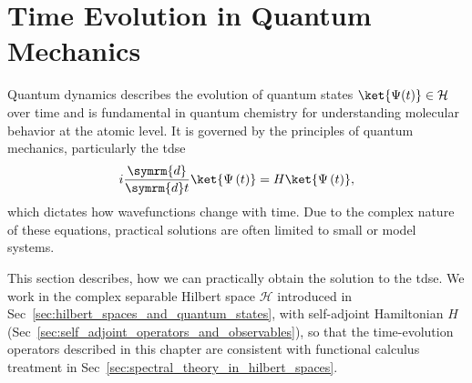 \chapter{Time Evolution in Quantum Mechanics}\label{sec:time_evolution}
Quantum dynamics describes the evolution of quantum states $\ket{\Psi(t)}\in\mathcal{H}$ over time and is fundamental in quantum chemistry for understanding molecular behavior at the atomic level. It is governed by the principles of quantum mechanics, particularly the \acrfull{tdse}
\begin{equation}\label{eq:tdse}
i\frac{\symrm{d}}{\symrm{d}t}\ket{\Psi\left(t\right)}=H\ket{\Psi\left(t\right)},
\end{equation}
which dictates how wavefunctions change with time. Due to the complex nature of these equations, practical solutions are often limited to small or model systems.

This section describes, how we can practically obtain the solution to the \acrshort{tdse}. We work in the complex separable Hilbert space $\mathcal{H}$ introduced in Sec~\ref{sec:hilbert_spaces_and_quantum_states}, with self-adjoint Hamiltonian $H$ (Sec~\ref{sec:self_adjoint_operators_and_observables}), so that the time-evolution operators described in this chapter are consistent with functional calculus treatment in Sec~\ref{sec:spectral_theory_in_hilbert_spaces}.
